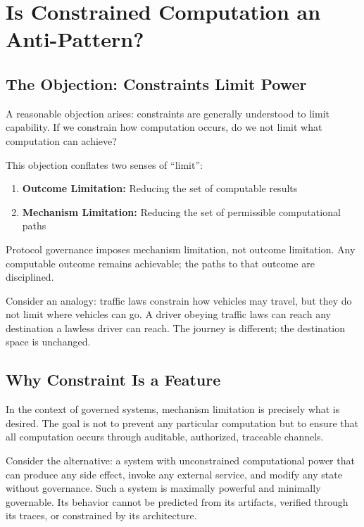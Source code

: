 \documentclass[11pt,a4paper]{article}
\begin{document}

\section{Is Constrained Computation an Anti-Pattern?}
\label{sec:antipattern}

\subsection{The Objection: Constraints Limit Power}

A reasonable objection arises: constraints are generally understood to limit capability. If we constrain how computation occurs, do we not limit what computation can achieve?

This objection conflates two senses of ``limit'':

\begin{enumerate}[nosep]
    \item \textbf{Outcome Limitation:} Reducing the set of computable results
    \item \textbf{Mechanism Limitation:} Reducing the set of permissible computational paths
\end{enumerate}

Protocol governance imposes mechanism limitation, not outcome limitation. Any computable outcome remains achievable; the paths to that outcome are disciplined.

Consider an analogy: traffic laws constrain how vehicles may travel, but they do not limit where vehicles can go. A driver obeying traffic laws can reach any destination a lawless driver can reach. The journey is different; the destination space is unchanged.

\subsection{Why Constraint Is a Feature}

In the context of governed systems, mechanism limitation is precisely what is desired. The goal is not to prevent any particular computation but to ensure that all computation occurs through auditable, authorized, traceable channels.

Consider the alternative: a system with unconstrained computational power that can produce any side effect, invoke any external service, and modify any state without governance. Such a system is maximally powerful and minimally governable. Its behavior cannot be predicted from its artifacts, verified through its traces, or constrained by its architecture.
\end{document}
